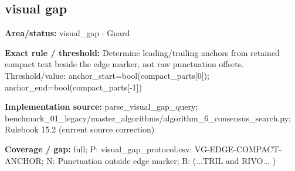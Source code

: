 \subsection*{visual gap}
\begin{tcolorbox}[enhanced,breakable,colback=white,colframe=Muted!45,boxrule=0.45pt,arc=1.5pt,left=6pt,right=6pt,top=5pt,bottom=5pt,title={\texttt{VG-COMPACT-EDGE-ANCHOR-03}},title after break={\texttt{VG-COMPACT-EDGE-ANCHOR-03}\ (continued)},fonttitle=\headingfont\bfseries\color{Navy},coltitle=Navy]
\textbf{Area/status:} visual\_\allowbreak{}gap $\boldsymbol{\cdot}$ Guard\par
\smallskip
\textbf{Exact rule / threshold:} Determine leading/\allowbreak{}trailing anchors from retained compact text beside the edge marker, not raw punctuation offsets. Threshold/\allowbreak{}value: anchor\_\allowbreak{}start=bool(compact\_\allowbreak{}parts[0]); anchor\_\allowbreak{}end=bool(compact\_\allowbreak{}parts[-1])\par
\smallskip
\textbf{Implementation source:} parse\_\allowbreak{}visual\_\allowbreak{}gap\_\allowbreak{}query; benchmark\_\allowbreak{}01\_\allowbreak{}legacy/\allowbreak{}master\_\allowbreak{}algorithms/\allowbreak{}algorithm\_\allowbreak{}6\_\allowbreak{}consensus\_\allowbreak{}search.py; Rulebook 15.2 (current source correction)\par
\smallskip
\textbf{Coverage / gap:} full; P: visual\_\allowbreak{}gap\_\allowbreak{}protocol.csv: VG-EDGE-COMPACT-ANCHOR; N: Punctuation outside edge marker; B: (...TRIL and RIVO... )
\end{tcolorbox}
